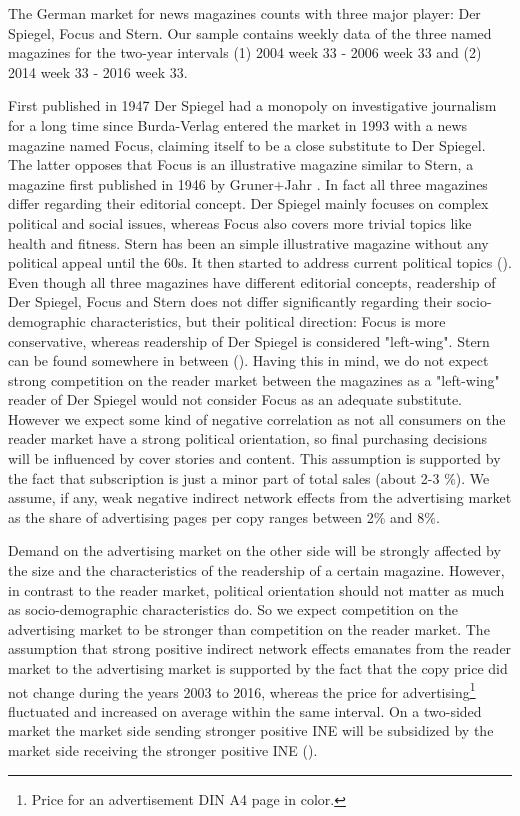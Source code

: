 \documentclass[10pt,a4paper]{scrreprt}
\begin{document}
The German market for news magazines counts with three major player: Der Spiegel, Focus and Stern. Our sample contains weekly data of the three named magazines for the two-year intervals (1) 2004 week 33 - 2006 week 33 and (2) 2014 week 33 - 2016 week 33. 
\par\medskip
First published in 1947 Der Spiegel had a monopoly on investigative journalism for a long time since Burda-Verlag entered the market in 1993 with a news magazine named Focus, claiming itself to be a close substitute to Der Spiegel. The latter opposes that Focus is an illustrative magazine similar to Stern, a magazine first published in 1946 by Gruner+Jahr \cite{kaltenhaeuser_abstimmung_2005}. In fact all three magazines differ regarding their editorial concept. Der Spiegel mainly focuses on complex political and social issues, whereas Focus also covers more trivial topics like health and fitness. Stern has been an simple illustrative magazine without any political appeal until the 60s. It then started to address current political topics (\cite{vogel_populaere_1998}). Even though all three magazines have different editorial concepts, readership of Der Spiegel, Focus and Stern does not differ significantly regarding their socio-demographic characteristics, but their political direction: Focus is more conservative, whereas readership of Der Spiegel is considered "left-wing". Stern can be found somewhere in between (\cite{kaltenhaeuser_abstimmung_2005}). Having this in mind, we do not expect strong competition on the reader market between the magazines as a "left-wing" reader of Der Spiegel would not consider Focus as an adequate substitute. However we expect some kind of negative correlation as not all consumers on the reader market have a strong political orientation, so final purchasing decisions will be influenced by cover stories and content. This assumption is supported by the fact that subscription is just a minor part of total sales (about 2-3 $\%$). We assume, if any, weak negative indirect network effects from the advertising market as the share of advertising pages per copy ranges between 2$\%$ and 8$\%$. 

Demand on the advertising market on the other side will be strongly affected by the size and the characteristics of the readership of a certain magazine. However, in contrast to the reader market, political orientation should not matter as much as socio-demographic characteristics do. So we expect competition on the advertising market to be stronger than competition on the reader market. The assumption that strong positive indirect network effects emanates from the reader market to the advertising market is supported by the fact that the copy price did not change during the years 2003 to 2016, whereas the price for advertising\footnote{Price for an advertisement DIN A4 page in color.} fluctuated and increased on average within the same interval. On a two-sided market the market side sending stronger positive INE will be subsidized by the market side receiving the stronger positive INE (\cite{dewenter_einfuehrung_2014}). 
\end{document}
